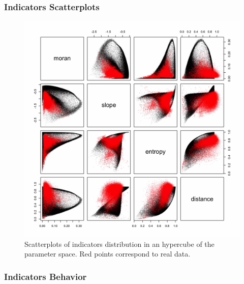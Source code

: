 \subsubsection*{Indicators Scatterplots}



\begin{figure}
\includegraphics[width=\textwidth]{figuresraw/scatter}
\caption{Scatterplots of indicators distribution in an hypercube of the parameter space. Red points correspond to real data.}
\label{fig:densityscatter}
\end{figure}



\subsubsection*{Indicators Behavior}




